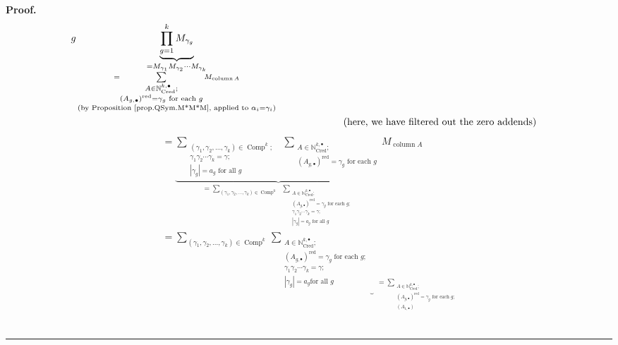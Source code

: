 \documentclass
[numbers=enddot,12pt,final,onecolumn,notitlepage,abstracton]{scrartcl}%
\theoremstyle{definition}
\newenvironment{proof}[1][Proof]{\noindent\textbf{#1.} }{\ \rule{0.5em}{0.5em}}
\let\sumnonlimits\sum
\let\prodnonlimits\prod
\renewcommand{\sum}{\sumnonlimits\limits}
\renewcommand{\prod}{\prodnonlimits\limits}
\begin{document}
\begin{proof}
\begin{align*}
{{g}}\underbrace{\prod_{g=1}^{k}M_{\gamma_{g}}}_{\substack{=M_{\gamma_{1}%
}M_{\gamma_{2}}\cdots M_{\gamma_{k}}\\=\sum_{\substack{A\in\mathbb{N}%
_{\operatorname*{Cred}}^{k,\bullet};\\\left(  A_{g,\bullet}\right)
^{\operatorname*{red}}=\gamma_{g}\text{ for each }g}}M_{\operatorname*{column}%
A}\\\text{(by Proposition \ref{prop.QSym.M*M*M}, applied to }\alpha_{i}%
=\gamma_{i}\text{)}}}\\
&  \ \ \ \ \ \ \ \ \ \ \ \ \ \ \ \ \ \ \ \ \left(  \text{here, we have
filtered out the zero addends}\right)
\end{align*}%
\begin{align}
&  =\underbrace{\sum_{\substack{\left(  \gamma_{1},\gamma_{2},\ldots
,\gamma_{k}\right)  \in\operatorname*{Comp}\nolimits^{k};\\\gamma_{1}%
\gamma_{2}\cdots\gamma_{k}=\gamma;\\\left\vert \gamma_{g}\right\vert
=a_{g}\text{ for all }g}}\ \ \sum_{\substack{A\in\mathbb{N}%
_{\operatorname*{Cred}}^{k,\bullet};\\\left(  A_{g,\bullet}\right)
^{\operatorname*{red}}=\gamma_{g}\text{ for each }g}}}_{=\sum_{\left(
\gamma_{1},\gamma_{2},\ldots,\gamma_{k}\right)  \in\operatorname*{Comp}%
\nolimits^{k}}\ \ \sum_{\substack{A\in\mathbb{N}_{\operatorname*{Cred}%
}^{k,\bullet};\\\left(  A_{g,\bullet}\right)  ^{\operatorname*{red}}%
=\gamma_{g}\text{ for each }g;\\\gamma_{1}\gamma_{2}\cdots\gamma_{k}%
=\gamma;\\\left\vert \gamma_{g}\right\vert =a_{g}\text{ for all }g}%
}}M_{\operatorname*{column}A}\nonumber\\
&  =\sum_{\left(  \gamma_{1},\gamma_{2},\ldots,\gamma_{k}\right)
\in\operatorname*{Comp}\nolimits^{k}}\underbrace{\sum_{\substack{A\in
\mathbb{N}_{\operatorname*{Cred}}^{k,\bullet};\\\left(  A_{g,\bullet}\right)
^{\operatorname*{red}}=\gamma_{g}\text{ for each }g;\\\gamma_{1}\gamma
_{2}\cdots\gamma_{k}=\gamma;\\\left\vert \gamma_{g}\right\vert =a_{g}\text{
for all }g}}}_{\substack{=\sum_{\substack{A\in\mathbb{N}_{\operatorname*{Cred}%
}^{k,\bullet};\\\left(  A_{g,\bullet}\right)  ^{\operatorname*{red}}%
=\gamma_{g}\text{ for each }g;\\\left(  A_{1,\bullet}\right)
}}}}
\end{align}
\end{proof}
\end{document}
